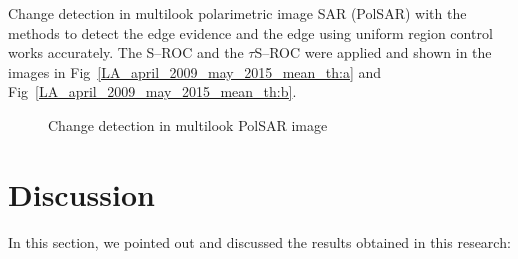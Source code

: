 \documentclass[remotesensing,article,submit,pdftex,moreauthors]{Definitions/mdpi}
\begin{document}
Change detection in multilook polarimetric image SAR (PolSAR) with the methods to detect the edge evidence and the edge using uniform region control works accurately. The S--ROC and the $\tau$S--ROC were applied and shown in the images in Fig~\eqref{LA_april_2009_may_2015_mean_th:a} and  Fig~\eqref{LA_april_2009_may_2015_mean_th:b}.
\begin{figure}[hbt]
	\centering
     \caption{Change detection in multilook PolSAR image}
     \label{LA_april_2009_may_2015_mean_th} 
   \end{figure}   
\section{Discussion}\label{sec:Discussion}
In this section, we pointed out and discussed the results obtained in this research:
 
\end{document}
